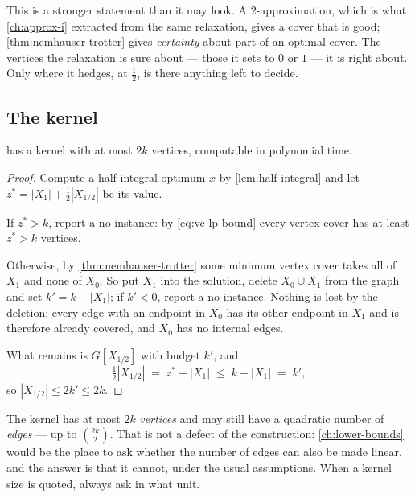 \begin{intuition}
This is a stronger statement than it may look. A $2$-approximation, which is
what \cref{ch:approx-i} extracted from the same relaxation, gives a cover that
is good; \cref{thm:nemhauser-trotter} gives \emph{certainty} about part of an
optimal cover. The vertices the relaxation is sure about --- those it sets to
$0$ or $1$ --- it is right about. Only where it hedges, at $\frac12$, is there
anything left to decide.
\end{intuition}

\subsection{The kernel}

\begin{theorem}\label{thm:vc-2k-kernel}
 has a kernel with at most $2k$ vertices, computable in
polynomial time.
\end{theorem}

\begin{proof}
Compute a half-integral optimum $x$ by \cref{lem:half-integral} and let
$z^{*} = |X_1| + \frac12|X_{1/2}|$ be its value.

If $z^{*} > k$, report a no-instance: by \eqref{eq:vc-lp-bound} every vertex
cover has at least $z^{*} > k$ vertices.

Otherwise, by \cref{thm:nemhauser-trotter} some minimum vertex cover takes all
of $X_1$ and none of $X_0$. So put $X_1$ into the solution, delete
$X_0 \cup X_1$ from the graph and set $k' = k - |X_1|$; if $k' < 0$, report a
no-instance. Nothing is lost by the deletion: every edge with an endpoint in
$X_0$ has its other endpoint in $X_1$ and is therefore already covered, and
$X_0$ has no internal edges.

What remains is $G[X_{1/2}]$ with budget $k'$, and
\[ \tfrac12 |X_{1/2}| \;=\; z^{*} - |X_1| \;\le\; k - |X_1| \;=\; k', \]
so $|X_{1/2}| \le 2k' \le 2k$.
\end{proof}

\begin{remark}\label{rem:kernel-vertices-vs-edges}
The kernel has at most $2k$ \emph{vertices} and may still have a quadratic
number of \emph{edges} --- up to $\binom{2k}{2}$. That is not a defect of the
construction: \cref{ch:lower-bounds} would be the place to ask whether the
number of edges can also be made linear, and the answer is that it cannot,
under the usual assumptions. When a kernel size is quoted, always ask in what
unit.
\end{remark}

